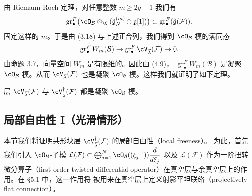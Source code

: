 由 Riemann-Roch 定理，对任意整数 $m\ge 2g-1$ 我们有
\[
  \operatorname{gr}^F_\bullet\bigl(\cO_\mathcal{B}\otimes_\C
  (\hat{\mathfrak{g}}_N^{(m)}\oplus\mathfrak{g}[1])\bigr)
  \subset\operatorname{gr}^F_\bullet(\hat{\mathfrak{g}}(\mathcal{F})) .
\]
固定这样的 $m$。于是由 (3.18) 与上述正合列，我们得到
$\cO_\mathcal{B}$-模的满同态
\[
  \operatorname{gr}^F_\bullet W_m(\mathcal{B})
  \to\operatorname{gr}^F_\bullet\cV_{\vec{\lambda}}(\mathcal{F})\to 0 .
\]
由命题 3.7，向量空间 $W_m$ 是有限维的。因此由 (4.9)，
$\operatorname{gr}^F_\bullet W_m(\mathcal{B})$ 是凝聚
$\cO_\mathcal{B}$-模。从而 $\cV_{\vec{\lambda}}(\mathcal{F})$ 也是凝聚
$\cO_\mathcal{B}$-模。这样我们就证明了如下定理。

\begin{theorem}[4.4]
层 $\cV_{\vec{\lambda}}(\mathcal{F})$ 与
$\cV_{\vec{\lambda}}^\dagger(\mathcal{F})$ 都是凝聚
$\cO_\mathcal{B}$-模。
\end{theorem}

\subsection{局部自由性 I（光滑情形）}

本节我们将证明共形块层
$\cV_{\vec{\lambda}}^\dagger(\mathcal{F})$ 的局部自由性（local freeness）。
为此，首先我们引入 $\cO_\mathcal{B}$-子模
$\mathcal{L}(\mathcal{F})\subset\bigoplus_{j=1}^N
\cO_\mathcal{B}((\xi_j^{-1}))\dfrac{d}{d\xi_j}$ 以及
$\mathcal{L}(\mathcal{F})$ 作为一阶扭转微分算子（first order twisted
differential operator）在真空层与余真空层上的作用。在 §5.1 中，这一作用将
被用来在真空层上定义射影平坦联络（projectively flat connection）。


